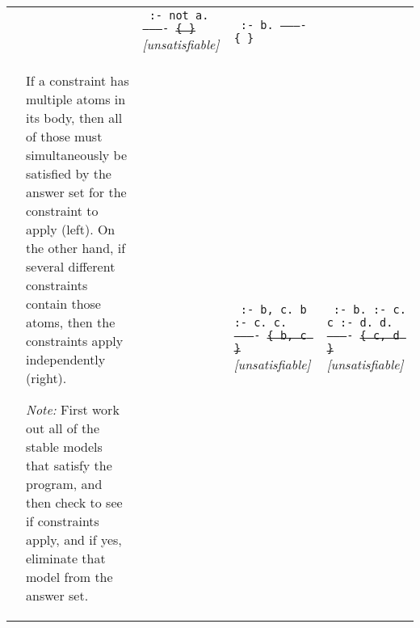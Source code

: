 \documentclass[10pt,a4paper,landscape]{article}
\begin{document}
\begin{longtable}{p{3cm}p{13.5cm}lp{4cm}p{4cm}}
		&& \texttt{%
			:- not a. \newline
			---------- \newline
			\sout{\{ \}}} \newline		
			\textit{[unsatisfiable]}
		& \texttt{%
			:- b. \newline
			---------- \newline
			\{ \} } \\
			
		& If a constraint has multiple atoms in its body, then all of those must simultaneously be satisfied by the answer set for the constraint to apply (left).
		On the other hand, if several different constraints contain those atoms, then the constraints apply independently (right). \newline
		
		\textit{Note:} First work out all of the stable models that satisfy the program, and then check to see if constraints apply, and if yes, eliminate that model from the answer set.
		&& \texttt{%
			:- b, c. \newline
			b :- c. \newline
			c. \newline
			---------- \newline
			\sout{\{ b, c \}} } \newline
			\textit{[unsatisfiable]}
		& \texttt{%
			:- b. \newline
			:- c. \newline
			c :- d. \newline
			d. \newline
			---------- \newline
			\sout{\{ c, d \}} } \newline
		\textit{[unsatisfiable]} \\ \midrule
		

\end{longtable}
\end{document}
